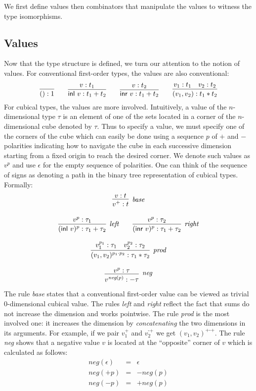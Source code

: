 \documentclass[authoryear,preprint]{sigplanconf}
\newcommand{\mm}{\texttt{-}}
\newcommand{\pp}{\texttt{+}}
\newcommand{\negp}[1]{\textit{neg}(#1)}
\newcommand{\inl}[1]{\textsf{inl}~#1}
\newcommand{\inr}[1]{\textsf{inr}~#1}
\begin{document}
We first define values then combinators that manipulate the values to witness
the type isomorphisms.

\subsection{Values} 

Now that the type structure is defined, we turn our attention to the notion
of values. For conventional first-order types, the values are also
conventional:
\[
\infer{() : 1}{} 
\qquad
\infer{\inl{v} : t_1 + t_2}{v : t_1}
\qquad
\infer{\inr{v} : t_1 + t_2}{v : t_2}
\qquad
\infer{(v_1,v_2) : t_1 * t_2}{v_1 : t_1 & v_2 : t_2}
\]
For cubical types, the values are more involved. Intuitively, a value of the
$n$-dimensional type $\tau$ is an element of one of the sets located in a
corner of the $n$-dimensional cube denoted by $\tau$. Thus to specify a
value, we must specify one of the corners of the cube which can easily be
done using a sequence $p$ of $+$ and $-$ polarities indicating how to
navigate the cube in each successive dimension starting from a fixed origin
to reach the desired corner. We denote such values as $v^{p}$ and use
$\epsilon$ for the empty sequence of polarities. One can think of the
sequence of signs as denoting a path in the binary tree representation of
cubical types. Formally:
\[\begin{array}{c}
\infer[\textit{base}]{v^{+} : t}{v : t} \\
\\
\infer[\textit{left}]{(\inl{v})^{p} : \tau_1 + \tau_2}{v^{p} : \tau_1}
\qquad
\infer[\textit{right}]{(\inr{v})^{p} : \tau_1 + \tau_2}{v^{p} : \tau_2} \\
\\
\infer[\textit{prod}]{(v_1,v_2)^{p_1 \cdot p_2} : \tau_1 * \tau_2}
      {v_1^{p_1} : \tau_1 & v_2^{p_2} : \tau_2} \\
\\
\infer[\textit{neg}]{v^{\negp{p}} : - \tau}{v^p : \tau} 
\end{array}\]
The rule \textit{base} states that a conventional first-order value can be
viewed as trivial $0$-dimensional cubical value. The rules \textit{left} and
\textit{right} reflect the fact that sums do not increase the dimension and
works pointwise. The rule \textit{prod} is the most involved one: it
increases the dimension by \emph{concatenating} the two dimensions in its
arguments. For example, if we pair $v_1^{\pp}$ and $v_2^{\mm\pp}$ we get
$(v_1,v_2)^{\pp\mm\pp}$. The rule \textit{neg} shows that a negative value
$v$ is located at the ``opposite'' corner of $v$ which is calculated as
follows:
\[\begin{array}{rcl}
\negp{\epsilon} &=& \epsilon \\
\negp{+p} &=& -\negp{p} \\
\negp{-p} &=& +\negp{p}
\end{array}\]
\end{document}
